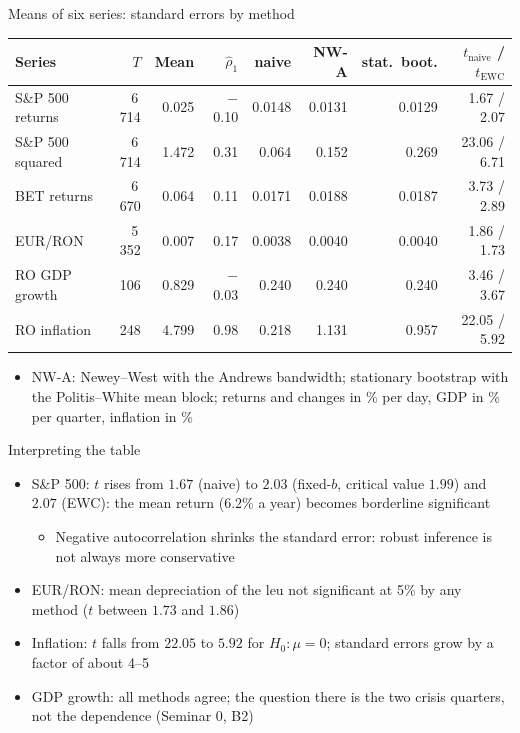 \begin{frame}{Means of six series: standard errors by method}
\itemsize{\footnotesize}
\begin{center}
\footnotesize
\begin{tabular}{lrrrrrrr}
\toprule
Series & $T$ & Mean & $\hat\rho_1$ & naive & NW-A & stat.\ boot. & $t_{\text{naive}}$ / $t_{\text{EWC}}$ \\
\midrule
S\&P 500 returns & 6\,714 & 0.025 & \ensuremath{-}0.10 & 0.0148 & 0.0131 & 0.0129 & 1.67 / 2.07 \\
S\&P 500 squared & 6\,714 & 1.472 & 0.31 & 0.064 & 0.152 & 0.269 & 23.06 / 6.71 \\
BET returns & 6\,670 & 0.064 & 0.11 & 0.0171 & 0.0188 & 0.0187 & 3.73 / 2.89 \\
EUR/RON & 5\,352 & 0.007 & 0.17 & 0.0038 & 0.0040 & 0.0040 & 1.86 / 1.73 \\
RO GDP growth & 106 & 0.829 & \ensuremath{-}0.03 & 0.240 & 0.240 & 0.240 & 3.46 / 3.67 \\
RO inflation & 248 & 4.799 & 0.98 & 0.218 & 1.131 & 0.957 & 22.05 / 5.92 \\
\bottomrule
\end{tabular}
\end{center}
\begin{itemize}
    \item NW-A: Newey--West with the Andrews bandwidth; stationary bootstrap with the Politis--White mean block; returns and changes in \% per day, GDP in \% per quarter, inflation in \%
\end{itemize}
\end{frame}

\begin{frame}{Interpreting the table}
\itemsize{\footnotesize}
\begin{itemize}
    \item S\&P 500: $t$ rises from $1.67$ (naive) to $2.03$ (fixed-$b$, critical value $1.99$) and $2.07$ (EWC): the mean return ($6.2\%$ a year) becomes borderline significant
    \begin{itemize}
        \item Negative autocorrelation shrinks the standard error: robust inference is not always more conservative
    \end{itemize}
    \item EUR/RON: mean depreciation of the leu not significant at 5\% by any method ($t$ between $1.73$ and $1.86$)
    \item Inflation: $t$ falls from $22.05$ to $5.92$ for $H_0: \mu = 0$; standard errors grow by a factor of about 4--5
    \item GDP growth: all methods agree; the question there is the two crisis quarters, not the dependence (Seminar 0, B2)
\end{itemize}
\end{frame}


